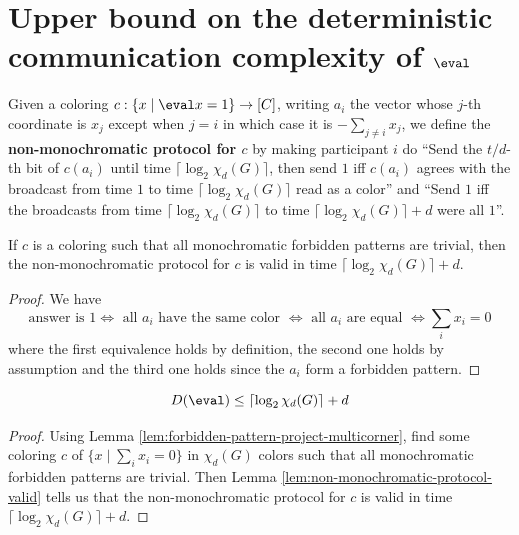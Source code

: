 \chapter{Upper bound on the deterministic communication complexity of \texorpdfstring{$\eval$}{eval}}

\begin{definition}
  \label{def:non-monochromatic-protocol}

  Given a coloring $c : \{x \mid \eval x = 1\} \to [C]$, writing $a_i$ the vector whose $j$-th coordinate is $x_j$ except when $j = i$ in which case it is $-\sum_{j \ne i} x_j$, we define the {\bf non-monochromatic protocol for $c$} by making participant $i$ do ``Send the $t / d$-th bit of $c(a_i)$ until time $\lceil\log_2\chi_d(G)\rceil$, then send $1$ iff $c(a_i)$ agrees with the broadcast from time $1$ to time $\lceil\log_2\chi_d(G)\rceil$ read as a color'' and ``Send $1$ iff the broadcasts from time $\lceil\log_2\chi_d(G)\rceil$ to time $\lceil\log_2\chi_d(G)\rceil + d$ were all $1$''.
\end{definition}

\begin{lemma}
  \label{lem:non-monochromatic-protocol-valid}

  If $c$ is a coloring such that all monochromatic forbidden patterns are trivial, then the non-monochromatic protocol for $c$ is valid in time $\lceil\log_2\chi_d(G)\rceil + d$.
\end{lemma}
\begin{proof}
  \uses{}

  We have
  $$\text{answer is } 1 \iff \text{ all $a_i$ have the same color } \iff \text{ all $a_i$ are equal } \iff \sum_i x_i = 0$$
  where the first equivalence holds by definition, the second one holds by assumption and the third one holds since the $a_i$ form a forbidden pattern.
\end{proof}

\begin{theorem}
  \label{thm:det-fun-complex-eval-le-corner-color-num}

  $$D(\eval) \le \lceil\log_2\chi_d(G)\rceil + d$$
\end{theorem}
\begin{proof}

  Using Lemma \ref{lem:forbidden-pattern-project-multicorner}, find some coloring $c$ of $\{x \mid \sum_i x_i = 0\}$ in $\chi_d(G)$ colors such that all monochromatic forbidden patterns are trivial. Then Lemma \ref{lem:non-monochromatic-protocol-valid} tells us that the non-monochromatic protocol for $c$ is valid in time $\lceil\log_2\chi_d(G)\rceil + d$.
\end{proof}

